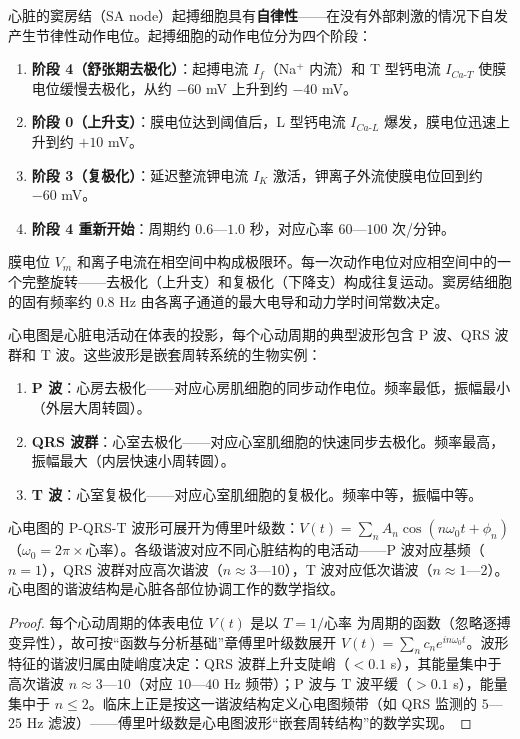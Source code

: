 \begin{definition}[心脏起搏细胞的电生理]\label{def:cardiac_pacemaker}
心脏的窦房结（SA node）起搏细胞具有\textbf{自律性}——在没有外部刺激的情况下自发产生节律性动作电位。起搏细胞的动作电位分为四个阶段：
\begin{enumerate}[label=(\roman*)]
    \item \textbf{阶段 4（舒张期去极化）}：起搏电流 $I_f$（Na$^+$ 内流）和 T 型钙电流 $I_{Ca\text{-}T}$ 使膜电位缓慢去极化，从约 $-60$ mV 上升到约 $-40$ mV。
    \item \textbf{阶段 0（上升支）}：膜电位达到阈值后，L 型钙电流 $I_{Ca\text{-}L}$ 爆发，膜电位迅速上升到约 $+10$ mV。
    \item \textbf{阶段 3（复极化）}：延迟整流钾电流 $I_K$ 激活，钾离子外流使膜电位回到约 $-60$ mV。
    \item \textbf{阶段 4 重新开始}：周期约 $0.6$—$1.0$ 秒，对应心率 $60$—$100$ 次/分钟。
\end{enumerate}
膜电位 $V_m$ 和离子电流在相空间中构成极限环。每一次动作电位对应相空间中的一个完整旋转——去极化（上升支）和复极化（下降支）构成往复运动。窦房结细胞的固有频率约 $0.8$ Hz 由各离子通道的最大电导和动力学时间常数决定。
\end{definition}

\begin{proposition}[心电图的周期结构]\label{prop:ecg_periodic}
心电图是心脏电活动在体表的投影，每个心动周期的典型波形包含 P 波、QRS 波群和 T 波。这些波形是嵌套周转系统的生物实例：
\begin{enumerate}[label=(\roman*)]
    \item \textbf{P 波}：心房去极化——对应心房肌细胞的同步动作电位。频率最低，振幅最小（外层大周转圆）。
    \item \textbf{QRS 波群}：心室去极化——对应心室肌细胞的快速同步去极化。频率最高，振幅最大（内层快速小周转圆）。
    \item \textbf{T 波}：心室复极化——对应心室肌细胞的复极化。频率中等，振幅中等。
\end{enumerate}
心电图的 P-QRS-T 波形可展开为傅里叶级数：$V(t) = \sum_{n} A_n \cos(n\omega_0 t + \phi_n)$（$\omega_0 = 2\pi \times \text{心率}$）。各级谐波对应不同心脏结构的电活动——P 波对应基频（$n=1$），QRS 波群对应高次谐波（$n \approx 3$—$10$），T 波对应低次谐波（$n \approx 1$—$2$）。心电图的谐波结构是心脏各部位协调工作的数学指纹。
\end{proposition}

\begin{proof}
每个心动周期的体表电位 $V(t)$ 是以 $T = 1/\text{心率}$ 为周期的函数（忽略逐搏变异性），故可按“函数与分析基础”章傅里叶级数展开 $V(t) = \sum_n c_n e^{in\omega_0 t}$。波形特征的谐波归属由陡峭度决定：QRS 波群上升支陡峭（$<0.1$ s），其能量集中于高次谐波 $n \approx 3$—$10$（对应 $10$—$40$ Hz 频带）；P 波与 T 波平缓（$>0.1$ s），能量集中于 $n \le 2$。临床上正是按这一谐波结构定义心电图频带（如 QRS 监测的 $5$—$25$ Hz 滤波）——傅里叶级数是心电图波形“嵌套周转结构”的数学实现。
\end{proof}

